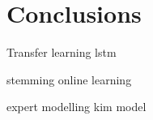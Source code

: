 \section{Conclusions} \label{sec:conclusion}

Transfer learning  lstm

stemming online learning 

expert modelling kim model